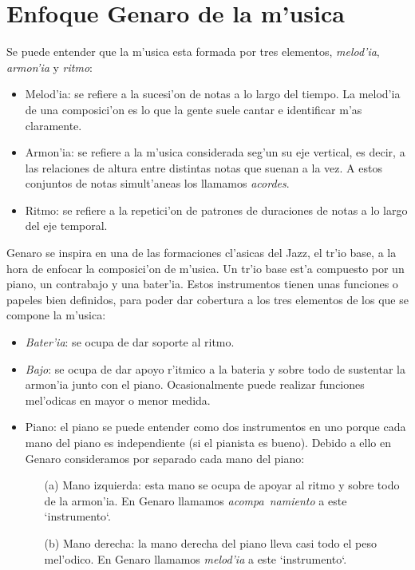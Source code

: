 ﻿\documentclass[a4paper,12pt]{article}
\begin{document}
\section{Enfoque Genaro de la m'usica}
Se puede entender que la m'usica esta formada por tres elementos, \emph{melod'ia}, \emph{armon'ia} y \emph{ritmo}:
\begin{itemize}
\item Melod'ia: se refiere a la sucesi'on de notas a lo largo del tiempo. La melod'ia de una composici'on es lo que la gente suele cantar e identificar m'as claramente.
\item Armon'ia: se refiere a la m'usica considerada seg'un su eje vertical, es decir, a las relaciones de altura entre distintas notas que suenan a la vez. A estos conjuntos de notas simult'aneas los llamamos \emph{acordes}.
\item Ritmo: se refiere a la repetici'on de patrones de duraciones de notas a lo largo del eje temporal.
\end{itemize}

Genaro se inspira en una de las formaciones cl'asicas del Jazz, el tr'io base, a la hora de enfocar la composici'on de m'usica. Un tr'io base est'a compuesto por un piano, un contrabajo y una bater'ia. Estos instrumentos tienen unas funciones o papeles bien definidos, para poder dar cobertura a los tres elementos de los que se compone la m'usica:
\begin{itemize}
\item \emph{Bater'ia}: se ocupa de dar soporte al ritmo.
\item \emph{Bajo}: se ocupa de dar apoyo r'itmico a la bateria y sobre todo de sustentar la armon'ia junto con el piano. Ocasionalmente puede realizar funciones mel'odicas en mayor o menor medida.
\item Piano: el piano se puede entender como dos instrumentos en uno porque cada mano del piano es independiente (si el pianista es bueno). Debido a ello en Genaro consideramos por separado cada mano del piano:
        \begin{enumerate}
        \item[(a)] Mano izquierda: esta mano se ocupa de apoyar al ritmo y sobre todo de la armon'ia. En Genaro llamamos \emph{acompa~namiento} a este `instrumento`.
        \item[(b)] Mano derecha: la mano derecha del piano lleva casi todo el peso mel'odico. En Genaro llamamos \emph{melod'ia} a este `instrumento`.
        \end{enumerate}
\end{itemize}
\end{document}

